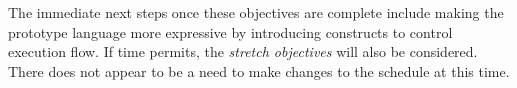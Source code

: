 \documentclass[a4paper]{article}
\begin{document}
The immediate next steps once these objectives are complete include making the prototype language more expressive by introducing constructs to control execution flow. If time permits, the \emph{stretch objectives} will also be considered. There does not appear to be a need to make changes to the schedule at this time.






\end{document}
